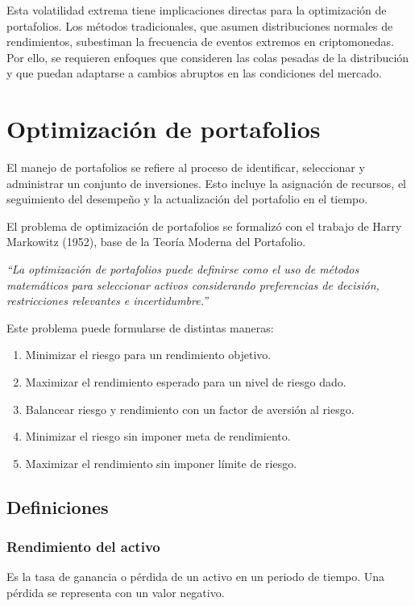 Esta volatilidad extrema tiene implicaciones directas para la
optimización de portafolios. Los métodos tradicionales, que asumen
distribuciones normales de rendimientos, subestiman la frecuencia de
eventos extremos en criptomonedas. Por ello, se requieren enfoques
que consideren las colas pesadas de la distribución y que puedan
adaptarse a cambios abruptos en las condiciones del mercado.

\section{Optimización de portafolios}

El manejo de portafolios se refiere al proceso de identificar,
seleccionar y administrar un conjunto de inversiones. Esto incluye la
asignación de recursos, el seguimiento del desempeño y la
actualización del portafolio en el tiempo.

El problema de optimización de portafolios se formalizó con el trabajo
de Harry Markowitz (1952), base de la Teoría Moderna del Portafolio.

\begin{center}
  \itshape
  ``La optimización de portafolios puede definirse como el uso de
  métodos matemáticos para seleccionar activos considerando
  preferencias de decisión, restricciones relevantes e incertidumbre.''
\end{center}

Este problema puede formularse de distintas maneras:

\begin{enumerate}[label=\Roman*., leftmargin=1.5cm]
  \item Minimizar el riesgo para un rendimiento objetivo.
  \item Maximizar el rendimiento esperado para un nivel de riesgo dado.
  \item Balancear riesgo y rendimiento con un factor de aversión al riesgo.
  \item Minimizar el riesgo sin imponer meta de rendimiento.
  \item Maximizar el rendimiento sin imponer límite de riesgo.
\end{enumerate}

\subsection{Definiciones}

\subsubsection{Rendimiento del activo}
Es la tasa de ganancia o pérdida de un activo en un periodo de tiempo.
Una pérdida se representa con un valor negativo.


